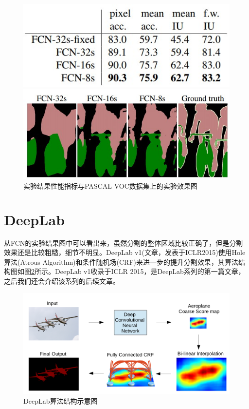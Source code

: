\documentclass[cn]{elegantbook}
\begin{document}
\begin{figure}[!h]
	\centering
	\begin{minipage}[t]{0.85\textwidth}
		\centering
		\includegraphics[width=\textwidth]{images/fcnres}
	\end{minipage}
	\begin{minipage}[t]{0.85\textwidth}
		\centering
		\includegraphics[width=\textwidth]{images/fcnres1}
	\end{minipage}
	\caption{\label{fcnres}实验结果性能指标与PASCAL VOC数据集上的实验效果图}
\end{figure}

\section{DeepLab}
从FCN的实验结果图中可以看出来，虽然分割的整体区域比较正确了，但是分割效果还是比较粗糙，细节不明显。DeepLab v1(文章\cite{chen2014semantic}，发表于ICLR2015)使用Hole算法(Atrous Algorithm)和条件随机场(CRF)来进一步的提升分割效果，其算法结构图如图\ref{deeplabv1}所示。DeepLab v1收录于ICLR 2015，是DeepLab系列的第一篇文章，之后我们还会介绍该系列的后续文章。

\begin{figure}[!h]
	\centering
	\includegraphics[width=\textwidth]{images/deeplabv1}
	\caption{\label{deeplabv1}DeepLab算法结构示意图}
\end{figure}
\end{document}
